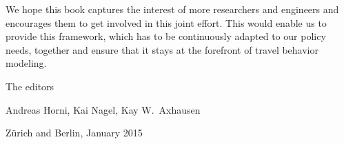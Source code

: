 

We hope this book captures the interest of more researchers and engineers and encourages them to get involved in this joint effort. This would enable us to provide this \gls{framework}, which has to be continuously adapted to our policy needs, together and ensure that it stays at the forefront of travel behavior modeling.

The editors

Andreas Horni, 	Kai Nagel,	Kay W.\ Axhausen


Zürich and Berlin, January 2015

%

